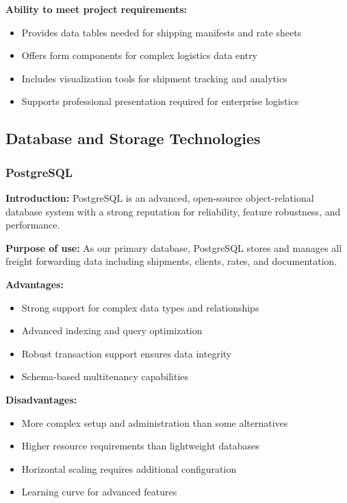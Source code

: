 \textbf{Ability to meet project requirements:}
\begin{itemize}
    \item Provides data tables needed for shipping manifests and rate sheets
    \item Offers form components for complex logistics data entry
    \item Includes visualization tools for shipment tracking and analytics
    \item Supports professional presentation required for enterprise logistics
\end{itemize}

\subsection{Database and Storage Technologies}
\subsubsection{PostgreSQL}
\textbf{Introduction:} PostgreSQL \cite{postgres} is an advanced, open-source object-relational database system with a strong reputation for reliability, feature robustness, and performance.

\textbf{Purpose of use:} As our primary database, PostgreSQL stores and manages all freight forwarding data including shipments, clients, rates, and documentation.

\textbf{Advantages:}
\begin{itemize}
    \item Strong support for complex data types and relationships
    \item Advanced indexing and query optimization
    \item Robust transaction support ensures data integrity
    \item Schema-based multitenancy capabilities
\end{itemize}

\textbf{Disadvantages:}
\begin{itemize}
    \item More complex setup and administration than some alternatives
    \item Higher resource requirements than lightweight databases
    \item Horizontal scaling requires additional configuration
    \item Learning curve for advanced features
\end{itemize}

